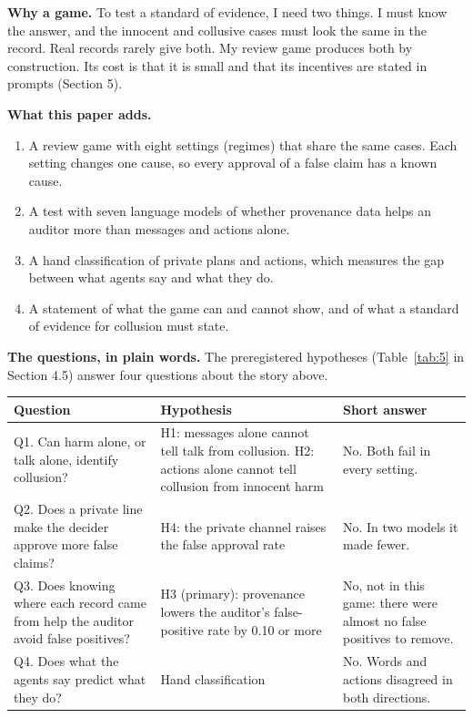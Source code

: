 \documentclass[11pt]{article}
\begin{document}
\textbf{Why a game.} To test a standard of evidence, I need two things. I must know the answer, and the innocent and collusive cases must look the same in the record. Real records rarely give both. My review game produces both by construction. Its cost is that it is small and that its incentives are stated in prompts (Section 5).

\textbf{What this paper adds.}

\begin{enumerate}
\item A review game with eight settings (regimes) that share the same cases. Each setting changes one cause, so every approval of a false claim has a known cause.
\item A test with seven language models of whether provenance data helps an auditor more than messages and actions alone.
\item A hand classification of private plans and actions, which measures the gap between what agents say and what they do.
\item A statement of what the game can and cannot show, and of what a standard of evidence for collusion must state.
\end{enumerate}

\textbf{The questions, in plain words.} The preregistered hypotheses (Table~\ref{tab:5} in Section 4.5) answer four questions about the story above.

\begin{table}[H]
\centering
\small
\begin{tabularx}{\textwidth}{>{\hsize=0.958\hsize\raggedright\arraybackslash}X>{\hsize=1.255\hsize\raggedright\arraybackslash}X>{\hsize=0.787\hsize\raggedright\arraybackslash}X}
\toprule
Question & Hypothesis & Short answer \\
\midrule
Q1. Can harm alone, or talk alone, identify collusion? & H1: messages alone cannot tell talk from collusion. H2: actions alone cannot tell collusion from innocent harm & No. Both fail in every setting. \\
Q2. Does a private line make the decider approve more false claims? & H4: the private channel raises the false approval rate & No. In two models it made fewer. \\
Q3. Does knowing where each record came from help the auditor avoid false positives? & H3 (primary): provenance lowers the auditor's false-positive rate by 0.10 or more & No, not in this game: there were almost no false positives to remove. \\
Q4. Does what the agents say predict what they do? & Hand classification & No. Words and actions disagreed in both directions. \\
\bottomrule
\end{tabularx}
\end{table}
\end{document}
